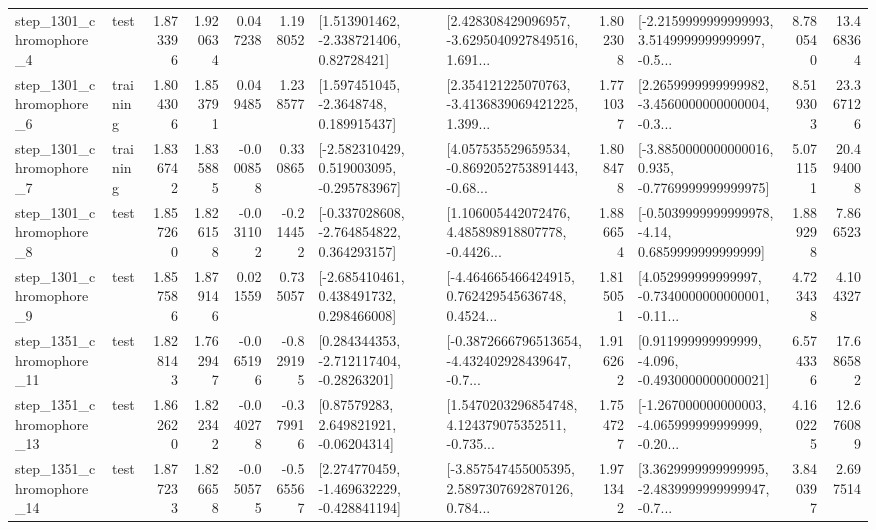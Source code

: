 \begin{tabular}{llrrrrllrlrr}
  step\_1301\_chromophore\_4 &      test &      1.873396 &    1.920634 &      0.047238 &  1.198052 &     [1.513901462, -2.338721406, 0.82728421] &  [2.428308429096957, -3.6295040927849516, 1.691... &       1.802308 &  [-2.2159999999999993, 3.5149999999999997, -0.5... &            8.780540 &         13.468364 \\
  step\_1301\_chromophore\_6 &  training &      1.804306 &    1.853791 &      0.049485 &  1.238577 &      [1.597451045, -2.3648748, 0.189915437] &  [2.354121225070763, -3.4136839069421225, 1.399... &       1.771037 &  [2.2659999999999982, -3.4560000000000004, -0.3... &            8.519303 &         23.367126 \\
  step\_1301\_chromophore\_7 &  training &      1.836742 &    1.835885 &     -0.000858 &  0.330865 &   [-2.582310429, 0.519003095, -0.295783967] &  [4.057535529659534, -0.8692052753891443, -0.68... &       1.808478 &  [-3.8850000000000016, 0.935, -0.7769999999999975] &            5.071151 &         20.494008 \\
  step\_1301\_chromophore\_8 &      test &      1.857260 &    1.826158 &     -0.031102 & -0.214452 &   [-0.337028608, -2.764854822, 0.364293157] &  [1.106005442072476, 4.485898918807778, -0.4426... &       1.886654 &   [-0.5039999999999978, -4.14, 0.6859999999999999] &            1.889298 &          7.866523 \\
  step\_1301\_chromophore\_9 &      test &      1.857586 &    1.879146 &      0.021559 &  0.735057 &    [-2.685410461, 0.438491732, 0.298466008] &  [-4.464665466424915, 0.762429545636748, 0.4524... &       1.815051 &  [4.052999999999997, -0.7340000000000001, -0.11... &            4.723438 &          4.104327 \\
 step\_1351\_chromophore\_11 &      test &      1.828143 &    1.762947 &     -0.065196 & -0.829195 &    [0.284344353, -2.712117404, -0.28263201] &  [-0.3872666796513654, -4.432402928439647, -0.7... &       1.916262 &   [0.911999999999999, -4.096, -0.4930000000000021] &            6.574336 &         17.686582 \\
 step\_1351\_chromophore\_13 &      test &      1.862620 &    1.822342 &     -0.040278 & -0.379916 &      [0.87579283, 2.649821921, -0.06204314] &  [1.5470203296854748, 4.124379075352511, -0.735... &       1.754727 &  [-1.267000000000003, -4.065999999999999, -0.20... &            4.160225 &         12.676089 \\
 step\_1351\_chromophore\_14 &      test &      1.877233 &    1.826658 &     -0.050575 & -0.565567 &   [2.274770459, -1.469632229, -0.428841194] &  [-3.857547455005395, 2.5897307692870126, 0.784... &       1.971342 &  [3.3629999999999995, -2.4839999999999947, -0.7... &            3.840397 &          2.697514 \\

\end{tabular}
